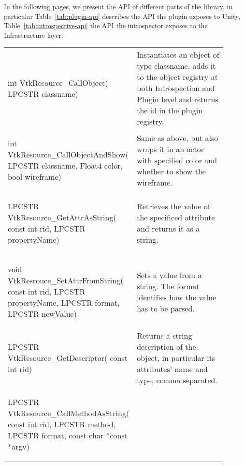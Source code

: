 \begin{appendices}
In the following pages, we present the API of different parts of the library, in particular Table~\ref{tab:plugin-api} describes the API the plugin exposes to Unity, Table~\ref{tab:introspective-api} the API the introspector exposes to the Infrastructure layer.

\begin{landscape}
	\begin{longtable}[c]{
			>{\raggedright\arraybackslash}p{0.4\linewidth}
			>{\raggedright\arraybackslash}p{0.5\linewidth}
		}
		\multicolumn{1}{c}{\textbf{Function signature}} &
		\multicolumn{1}{c}{\textbf{Explenation}} 
		\\ \hline
	\endhead
	\begin{codify}
	int VtkResource_CallObject(
		LPCSTR classname)
	\end{codify} &
	Instantiates an object of type classname, adds it to the object registry at both Introspection and Plugin level and returns the id in the plugin registry.
	\\
	\begin{codify}
	int VtkResource_CallObjectAndShow(
		LPCSTR classname,
		Float4 color,
		bool wireframe)
	\end{codify} &
	Same as above, but also wraps it in an actor with specified color and whether to show the wireframe.
	\\
	\begin{codify}
	LPCSTR VtkResource_GetAttrAsString(
		const int rid,
		LPCSTR propertyName)
	\end{codify} &
	Retrieves the value of the specificed attribute and returns it as a string.
	\\
	\begin{codify}
	void VtkResrouce_SetAttrFromString(
		const int rid,
		LPCSTR propertyName,
		LPCSTR format,
		LPCSTR newValue)
	\end{codify} &
	Sets a value from a string. The format identifies how the value has to be parsed.
	\\
	\begin{codify}
	LPCSTR VtkResource_GetDescriptor(
		const int rid)
	\end{codify} &
	Returns a string description of the object, in particular its attributes' name and type, comma separated.
	\\
	\begin{codify}
	LPCSTR VtkResource_CallMethodAsString(
		const int rid,
		LPCSTR method,
		LPCSTR format,
		const char *const *argv)
	\end{codify} &

\end{longtable}
\end{landscape}
\end{appendices}
